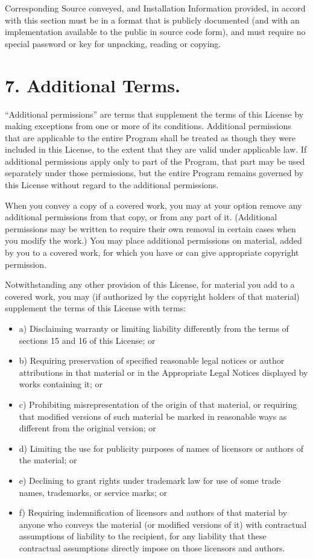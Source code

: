 \documentclass[11pt,a4paper]{article}
\begin{document}
Corresponding Source conveyed, and Installation Information provided, in
accord with this section must be in a format that is publicly documented
(and with an implementation available to the public in source code
form), and must require no special password or key for unpacking,
reading or copying.

\part*{7. Additional Terms.}

“Additional permissions” are terms that supplement the terms of this
License by making exceptions from one or more of its conditions.
Additional permissions that are applicable to the entire Program shall
be treated as though they were included in this License, to the extent
that they are valid under applicable law. If additional permissions
apply only to part of the Program, that part may be used separately
under those permissions, but the entire Program remains governed by this
License without regard to the additional permissions.

When you convey a copy of a covered work, you may at your option remove
any additional permissions from that copy, or from any part of it.
(Additional permissions may be written to require their own removal in
certain cases when you modify the work.) You may place additional
permissions on material, added by you to a covered work, for which you
have or can give appropriate copyright permission.

Notwithstanding any other provision of this License, for material you
add to a covered work, you may (if authorized by the copyright holders
of that material) supplement the terms of this License with terms:
\begin{itemize}
\item a) Disclaiming warranty or limiting liability differently from the
terms of sections 15 and 16 of this License; or
\item b) Requiring preservation of specified reasonable legal notices or
author attributions in that material or in the Appropriate Legal Notices
displayed by works containing it; or
\item c) Prohibiting misrepresentation of the origin of that material,
or requiring that modified versions of such material be marked in
reasonable ways as different from the original version; or
\item d) Limiting the use for publicity purposes of names of licensors
or authors of the material; or
\item e) Declining to grant rights under trademark law for use of some
trade names, trademarks, or service marks; or
\item f) Requiring indemnification of licensors and authors of that
material by anyone who conveys the material (or modified versions of it)
with contractual assumptions of liability to the recipient, for any
liability that these contractual assumptions directly impose on those
licensors and authors.

\end{itemize}
\end{document}
